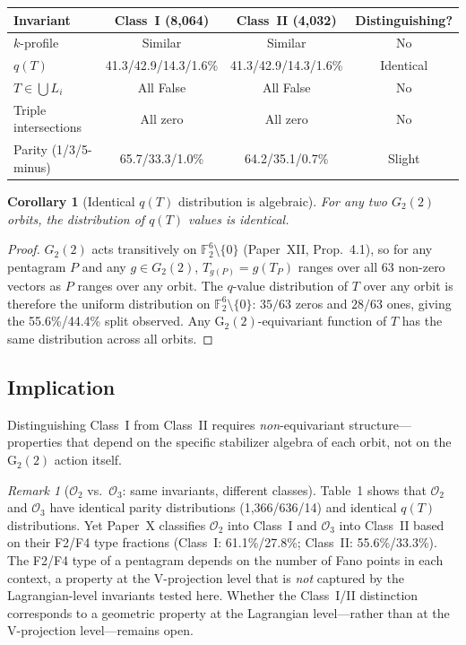 \documentclass[11pt,a4paper]{article}
\newtheorem{corollary}[theorem]{Corollary}
\theoremstyle{remark}
\newtheorem{remark}[theorem]{Remark}
\newcommand{\F}{\mathbb{F}}
\begin{document}
\begin{center}
\begin{tabular}{lccc}
\toprule
Invariant & Class~I (8{,}064) & Class~II (4{,}032) & Distinguishing? \\
\midrule
$k$-profile & Similar & Similar & No \\
$q(T)$ & 41.3/42.9/14.3/1.6\% & 41.3/42.9/14.3/1.6\% & Identical \\
$T \in \bigcup L_i$ & All False & All False & No \\
Triple intersections & All zero & All zero & No \\
Parity (1/3/5-minus) & 65.7/33.3/1.0\% & 64.2/35.1/0.7\% & Slight \\
\bottomrule
\end{tabular}
\end{center}

\begin{corollary}[Identical $q(T)$ distribution is algebraic]\label{cor:qT-identical}
For any two $G_2(2)$ orbits, the distribution of $q(T)$ values is identical.
\end{corollary}

\begin{proof}
$G_2(2)$ acts transitively on $\F_2^6 \setminus \{0\}$ (Paper~XII, Prop.~4.1), so
for any pentagram $P$ and any $g \in G_2(2)$, $T_{g(P)} = g(T_P)$ ranges over all
63 non-zero vectors as $P$ ranges over any orbit. The $q$-value distribution of $T$
over any orbit is therefore the uniform distribution on $\F_2^6 \setminus \{0\}$:
$35/63$ zeros and $28/63$ ones, giving the 55.6\%/44.4\% split observed.
Any G$_2(2)$-equivariant function of $T$ has the same distribution across all orbits.
\end{proof}

\subsection{Implication}

Distinguishing Class~I from Class~II requires \emph{non}-equivariant structure---properties that depend on the specific stabilizer algebra of each orbit, not on the G$_2(2)$ action itself.

\begin{remark}[$\mathcal{O}_2$ vs.\ $\mathcal{O}_3$: same invariants, different classes]
Table~1 shows that $\mathcal{O}_2$ and $\mathcal{O}_3$ have identical parity distributions
(1{,}366/636/14) and identical $q(T)$ distributions.
Yet Paper~X classifies $\mathcal{O}_2$ into Class~I and $\mathcal{O}_3$ into Class~II
based on their F2/F4 type fractions (Class~I: 61.1\%/27.8\%; Class~II: 55.6\%/33.3\%).
The F2/F4 type of a pentagram depends on the number of Fano points in each context,
a property at the V-projection level that is \emph{not} captured by the Lagrangian-level
invariants tested here.
Whether the Class~I/II distinction corresponds to a geometric property at the Lagrangian
level---rather than at the V-projection level---remains open.
\end{remark}
\end{document}
